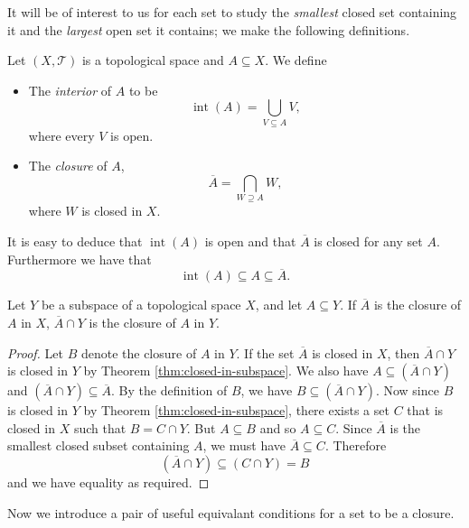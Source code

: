 It will be of interest to us for each set to study the \emph{smallest}
closed set containing it and the \emph{largest} open set it contains;
we make the following definitions.

\begin{defn}
  Let $(X, \mathscr{T})$ is a topological space and $A \subseteq
  X$. We define
  \begin{itemize}
  \item The \emph{interior} of $A$ to be
    \[
      \operatorname{int}(A) = \bigcup_{V \subseteq A} V,
    \]
    where every $V$ is open.
  \item The \emph{closure} of $A$,
    \[
      \overline{A} = \bigcap_{W \supseteq A} W,
    \]
    where $W$ is closed in $X$.
  \end{itemize}
\end{defn}

It is easy to deduce that $\operatorname{int}(A)$ is open and that
$\overline{A}$ is closed for any set $A$. Furthermore we have that
\[
  \operatorname{int}(A) \subseteq A \subseteq \overline{A}.
\]


\begin{thm}
  Let $Y$ be a subspace of a topological space $X$, and let $A
  \subseteq Y$. If $\overline{A}$ is the closure of $A$ in $X$,
  $\overline{A} \cap Y$ is the closure of $A$ in $Y$.
\end{thm}

\begin{proof}
  Let $B$ denote the closure of $A$ in $Y$. If the set $\overline{A}$
  is closed in $X$, then $\overline{A} \cap Y$ is closed in $Y$ by
  Theorem \ref{thm:closed-in-subspace}. We also have $A \subseteq
  (\overline{A} \cap Y)$ and $(\overline{A} \cap Y) \subseteq
  \overline{A}$. By the definition of $B$, we have $B \subseteq
  (\overline{A} \cap Y)$. Now since $B$ is closed in $Y$ by Theorem
  \ref{thm:closed-in-subspace}, there exists a set $C$ that is closed
  in $X$ such that $B = C \cap Y$. But $A \subseteq B$ and so $A
  \subseteq C$. Since $\overline{A}$ is the smallest closed subset
  containing $A$, we must have $\overline{A} \subseteq C$. Therefore
  \[
    (\overline{A} \cap Y) \subseteq (C \cap Y) = B
  \]
  and we have equality as required.
\end{proof}

Now we introduce a pair of useful equivalant conditions for a set to
be a closure.

